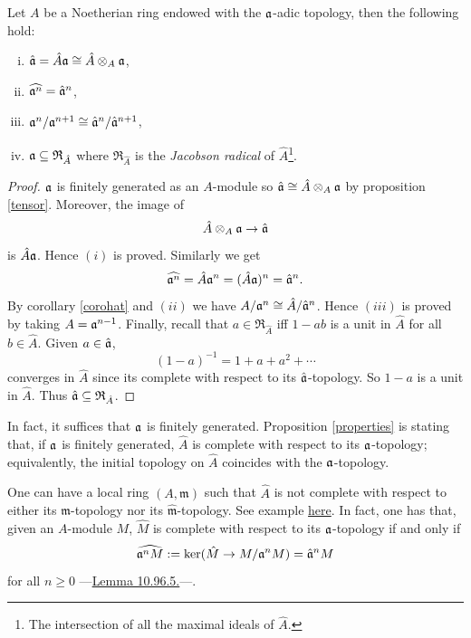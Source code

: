 \begin{prop}\label{properties}
    Let $A$ be a Noetherian ring endowed with the $\mathfrak{a}$-adic topology, then the following hold:
    \begin{enumerate}[(i)]
        \item $\hat {\mathfrak{a}} = \hat A\mathfrak{a}\cong \hat A\otimes_A\mathfrak{a}$,
        \item $\widehat{\mathfrak{a}^n}=\hat{\mathfrak{a}}^n$,
        \item $\mathfrak{a}^n/\mathfrak{a}^{n+1}\cong \hat{\mathfrak{a}}^n/\hat{\mathfrak{a}}^{n+1}$,
        \item $\mathfrak{a}\subseteq \mathfrak R_{\hat A}$ where $\mathfrak R_{\hat A}$ is the \emph{Jacobson radical} of $\hat A$\footnote{The intersection of all the maximal ideals of $\hat A$.}. 
    \end{enumerate}
\end{prop}
\begin{proof}
    $\mathfrak{a}$ is finitely generated as an $A$-module so $\hat{\mathfrak{a}}\cong \hat A\otimes_A \mathfrak{a}$ by proposition \ref{tensor}. Moreover, the image of 
    \[
    \hat A\otimes_A \mathfrak{a} \to \hat{\mathfrak{a}}
    \]
    is $\hat A\mathfrak{a}$. Hence $(i)$ is proved. Similarly we get
    \[
    \widehat{\mathfrak{a}^n}=\hat A\mathfrak{a}^n=(\hat A\mathfrak{a})^n=\hat {\mathfrak{a}}^n.
    \]
    By corollary \ref{corohat} and $(ii)$ we have $A/\mathfrak{a}^n\cong \hat A/\hat {\mathfrak{a}}^n$. Hence $(iii)$ is proved by taking $A=\mathfrak{a}^{n-1}$. Finally, recall that $a\in\mathfrak R_{\hat A}$ iff $1-ab$ is a unit in $\hat A$ for all $b\in \hat A$. Given $a\in\hat{\mathfrak{a}}$,
    \[
    (1-a)^{-1}=1+a+a^2+\cdots
    \]
    converges in $\hat A$ since its complete with respect to its $\hat{\mathfrak{a}}$-topology. So $1-a$ is a unit in $\hat A$. Thus $\hat{\mathfrak{a}}\subseteq\mathfrak R_{\hat A}$.
\end{proof}

In fact, it suffices that $\mathfrak{a}$ is finitely generated. Proposition \ref{properties} is stating that, if $\mathfrak{a}$ is finitely generated, $\hat A$ is complete with respect to its $\mathfrak{a}$-topology; equivalently, the initial topology on $\hat A$ coincides with the $\mathfrak{a}$-topology. 

\begin{eg}
    One can have a local ring $(A,\mathfrak m)$ such that $\hat A$ is not complete with respect to either its $\mathfrak m$-topology nor its $\hat{\mathfrak m}$-topology. See example \hyperlink{https://stacks.math.columbia.edu/tag/05JA}{here}. In fact, one has that, given an $A$-module $M$, $\hat M$ is complete with respect to its $\mathfrak{a}$-topology if and only if
    \[
    \widehat{\mathfrak{a}^nM}:=\ker(\hat M\to M/\mathfrak{a}^nM)=\hat{\mathfrak{a}}^nM
    \]
    for all $n\geq 0$ ---\hyperlink{https://stacks.math.columbia.edu/tag/0318}{Lemma 10.96.5.}---. 
\end{eg}

